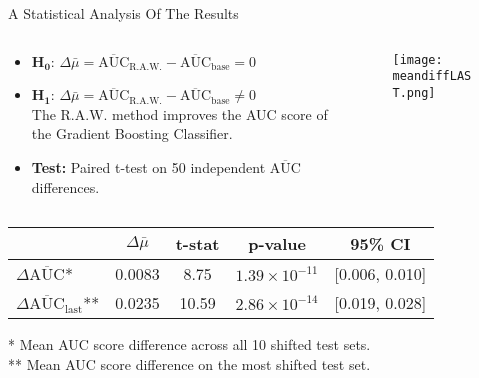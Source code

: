 \begin{frame}{A Statistical Analysis Of The Results}
    \begin{columns}[T]
        \begin{column}{0.6\textwidth}
            \begin{itemize}
                \item $\boldsymbol{H_0}$: $\Delta\bar{\mu} = \overline{\text{AUC}}_{\text{R.A.W.}} - \overline{\text{AUC}}_{\text{base}} = 0$ \\        
                \item $\boldsymbol{H_1}$: $\Delta\bar{\mu} = \overline{\text{AUC}}_{\text{R.A.W.}} - \overline{\text{AUC}}_{\text{base}} \neq 0$ \\
                \quad The R.A.W. method improves the AUC score of the Gradient Boosting Classifier.
                
                \item \textbf{Test:} Paired t-test on 50 independent $\overline{\text{AUC}}$ differences.
            \end{itemize}
            
            
            
            
        \end{column}
        
        \begin{column}{0.4\textwidth}
            \vspace{1em}
            \begin{figure}
                \centering
                \texttt{[image: meandiffLAST.png]}
            \end{figure}
        \end{column}
    \end{columns}

    \begin{table}
        \centering
        \small
        \begin{tabular}{lcccc}
            \toprule
            & $\Delta\bar{\mu}$ & t-stat & p-value & 95\% CI \\
            \midrule
            $\Delta\overline{\text{AUC}}$* & 0.0083 & 8.75  & $1.39 \times 10^{-11}$ & [0.006, 0.010] \\
            $\Delta\overline{\text{AUC}}_{\text{last}}$** & 0.0235 & 10.59 & $2.86 \times 10^{-14}$ & [0.019, 0.028] \\
            \bottomrule
        \end{tabular}
    \end{table}
    
    \begin{footnotesize}
        * Mean AUC score difference across all 10 shifted test sets. \\
        ** Mean AUC score difference on the most shifted test set.
    \end{footnotesize}
\end{frame}


    
